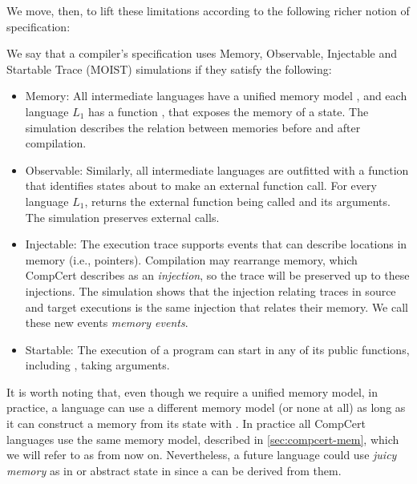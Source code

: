 We move, then, to lift these limitations according to the following richer notion of specification:
\begin{definition}
We say that a compiler's specification uses Memory, Observable, Injectable and Startable Trace (MOIST) simulations if they satisfy the following:
\begin{itemize}
\item Memory: All intermediate languages have a unified memory model , and each language $L_1$ has a function , that exposes the memory of a state. The simulation describes the relation between memories before and after compilation.  
\item Observable: Similarly, all intermediate languages are outfitted with a function  that identifies states about to make an external function call. For every language $L_1$,  returns the external function being called and its arguments. The simulation preserves external calls. 
\item Injectable: The execution trace supports events that can describe locations in memory (i.e., pointers). Compilation may rearrange memory, which CompCert describes as an \emph{injection}, so the trace will be preserved up to these injections. The simulation shows that the injection relating traces in source and target executions is the same injection that relates their memory. We call these new events \emph{memory events}.
\item Startable: The execution of a program can start in any of its public functions, including , taking arguments.  

\end{itemize}
\end{definition}
It is worth noting that, even though we require a unified memory model, in practice, a language can use a different memory model (or none at all) as long as it can construct a memory from its state with . In practice all CompCert languages use the same memory model, described in \autoref{sec:compcert-mem}, which we will refer to as  from now on.
Nevertheless, a future language could use \emph{juicy memory} as in \cite{appel14:plcc} or abstract state in \cite{Ronghui15abstractionlayers} since a  can be derived from them. 


